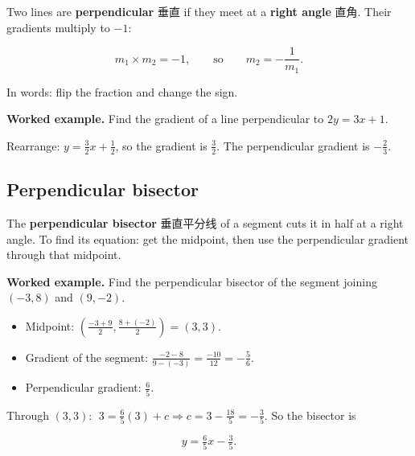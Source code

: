 \documentclass[11pt]{article}
\begin{document}
Two lines are \textbf{perpendicular} 垂直 if they meet at a \textbf{right angle} 直角. Their gradients multiply to $-1$:

\[
m_1 \times m_2 = -1, \qquad \text{so} \qquad m_2 = -\frac{1}{m_1}.
\]

In words: flip the fraction and change the sign.

\textbf{Worked example.} Find the gradient of a line perpendicular to $2y = 3x + 1$.

Rearrange: $y = \tfrac{3}{2}x + \tfrac{1}{2}$, so the gradient is $\tfrac{3}{2}$. The perpendicular gradient is $-\tfrac{2}{3}$.

\subsection*{Perpendicular bisector}

The \textbf{perpendicular bisector} 垂直平分线 of a segment cuts it in half at a right angle. To find its equation: get the midpoint, then use the perpendicular gradient through that midpoint.

\textbf{Worked example.} Find the perpendicular bisector of the segment joining $(-3, 8)$ and $(9, -2)$.

\begin{itemize}
\item Midpoint: $\left( \frac{-3 + 9}{2}, \frac{8 + (-2)}{2} \right) = (3, 3)$.

\item Gradient of the segment: $\frac{-2 - 8}{9 - (-3)} = \frac{-10}{12} = -\tfrac{5}{6}$.

\item Perpendicular gradient: $\frac{6}{5}$.

\end{itemize}

Through $(3, 3)$: $\; 3 = \tfrac{6}{5}(3) + c \Rightarrow c = 3 - \tfrac{18}{5} = -\tfrac{3}{5}$. So the bisector is

\[
y = \tfrac{6}{5}x - \tfrac{3}{5}.
\]
\end{document}
